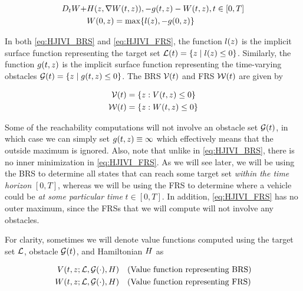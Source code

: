 \begin{equation}
\label{eq:HJIVI_FRS}
\begin{aligned}
D_t \valfuncfwd + &\ham(\state, \nabla \valfuncfwd(t, \state)), -\obsfunc(t, \state) - \valfuncfwd(t, \state), t \in [0, T]  \\
&\valfuncfwd(0, \state) = \max\{\fc(\state), -\obsfunc(0, \state)\}
\end{aligned}
\end{equation}

In both \eqref{eq:HJIVI_BRS} and \eqref{eq:HJIVI_FRS}, the function $l(z)$ is the implicit surface function representing the target set $\mathcal{L}(t) = \{z \mid l(z) \le 0\}$. Similarly, the function $g(t, z)$ is the implicit surface function representing the time-varying obstacles $\mathcal{G}(t) = \{z \mid g(t,z)\le 0\}$. The BRS $\mathcal{V}(t)$ and FRS $\mathcal{W}(t)$ are given by

\begin{equation}
\label{eq:implicitValfuncs}
\begin{aligned}
\brs(t) &= \{\state: \valfunc(t, \state) \le 0\} \\
\frs(t) &= \{\state: \valfuncfwd(t, \state) \le 0 \}
\end{aligned}
\end{equation}

Some of the reachability computations will not involve an obstacle set $\mathcal{G}(t)$, in which case we can simply set $g(t, z) \equiv \infty$ which effectively means that the outside maximum is ignored. Also, note that unlike in \eqref{eq:HJIVI_BRS}, there is no inner minimization in \eqref{eq:HJIVI_FRS}. As we will see later, we will be using the BRS to determine all states that can reach some target set \textit{within the time horizon} $[0,T]$, whereas we will be using the FRS to determine where a vehicle could be \textit{at some particular time} $t\in[0,T]$. In addition, \eqref{eq:HJIVI_FRS} has no outer maximum, since the FRSs that we will compute will not involve any obstacles.

 For clarity, sometimes we will denote value functions computed using the target set $\mathcal{L}$, obstacle $\mathcal{G}(t)$, and Hamiltonian $H$ as 

\begin{equation}
\begin{aligned}
V(t, z; \mathcal{L}, \mathcal{G}(\cdot), H) &\quad \text{(Value function representing BRS)} \\
W(t, z; \mathcal{L}, \mathcal{G}(\cdot), H) &\quad \text{(Value function representing FRS)}
\end{aligned}
\end{equation}

